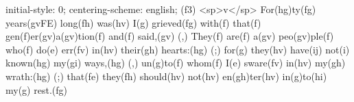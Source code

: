 initial-style: 0;
centering-scheme: english;
(f3) <sp>v</sp> For(hg)ty(fg) years(gvFE) long(fh) was(hv) I(g) grieved(fg) with(f) that(f) gen(f)er(gv)a(gv)tion(f) and(f) said,(gv) (,) They(f) are(f) a(gv) peo(gv)ple(f) who(f) do(e) err(fv) in(hv) their(gh) hearts:(hg) (;) for(g) they(hv) have(ij) not(i) known(hg) my(gi) ways,(hg) (,) un(g)to(f) whom(f) I(e) sware(fv) in(hv) my(gh) wrath:(hg) (;) that(fe) they(fh) should(hv) not(hv) en(gh)ter(hv) in(g)to(hi) my(g) rest.(fg)
